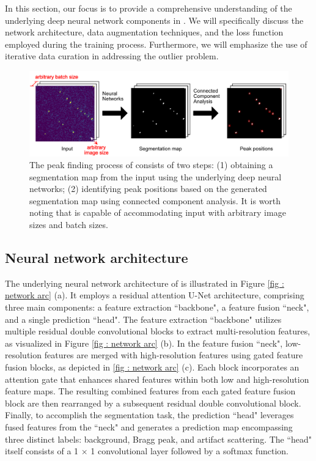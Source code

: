 \documentclass[a4paper]{article}
\begin{document}
In this section, our focus is to provide a comprehensive understanding of the
underlying deep neural network components in \peaknet{}.  We will specifically
discuss the network architecture, data augmentation techniques, and the loss
function employed during the training process.  Furthermore, we will emphasize
the use of iterative data curation in addressing the outlier problem.

\begin{figure}[!ht]
\includegraphics[width=\textwidth,keepaspectratio]
{./figures/peaknet_steps.pdf}
\caption{The peak finding process of \peaknet{} consists of two steps: (1)
obtaining a segmentation map from the input using the underlying deep neural
networks; (2) identifying peak positions based on the generated segmentation map
using connected component analysis.  It is worth noting that \peaknet{} is
capable of accommodating input with arbitrary image sizes and batch sizes.  }
\label{fig : peak finding}
\end{figure}


\subsection{Neural network architecture}

The underlying neural network architecture of \peaknet{} is illustrated in
Figure \ref{fig : network arc} (a).  It employs a residual attention U-Net
architecture, comprising three main components: a feature extraction ``backbone",
a feature fusion ``neck", and a single prediction ``head".  The feature
extraction ``backbone" utilizes multiple residual double convolutional blocks to
extract multi-resolution features, as visualized in Figure \ref{fig : network
arc} (b).  In the feature fusion ``neck", low-resolution features are merged
with high-resolution features using gated feature fusion blocks, as depicted in
\ref{fig : network arc} (c).  Each block incorporates an attention gate that
enhances shared features within both low and high-resolution feature maps.  The
resulting combined features from each gated feature fusion block are then
rearranged by a subsequent residual double convolutional block.  Finally, to
accomplish the segmentation task, the prediction ``head" leverages fused
features from the ``neck" and generates a prediction map encompassing three
distinct labels: background, Bragg peak, and artifact scattering.  The ``head"
itself consists of a 1 $\times$ 1 convolutional layer followed by a softmax
function.
\end{document}
